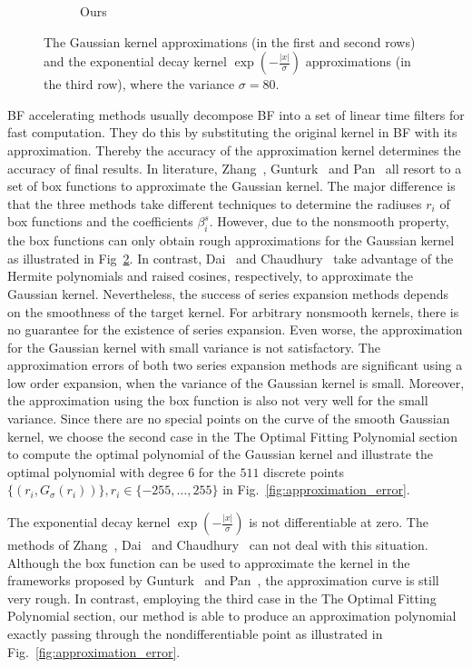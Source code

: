 \documentclass[twocolumn]{el-author}
\begin{document}
\begin{figure}[t]
\begin{subfigure}[b]{0.32\linewidth}
    \caption{Ours}
    \label{fig:minimax_path:path}
\end{subfigure}
\caption{The Gaussian kernel approximations (in the first and second rows) and the exponential decay kernel $\exp(-\frac{|x|}{\sigma})$  approximations (in the third row), where the variance $\sigma=80$.
}
\label{fig:gaussian}
\vspace{-0.1cm}
\end{figure}

BF accelerating methods usually decompose BF into a set of linear time filters for fast computation. They do this by substituting the original kernel in BF with its approximation. Thereby the accuracy of the approximation kernel determines the accuracy of final results. In literature, Zhang~\cite{Zhang_2012_TIP}, Gunturk~\cite{Gunturk_TIP_2011} and Pan~\cite{Pan_MPE_2014} all resort to a set of box functions to approximate the Gaussian kernel. The major difference is that the three methods take different techniques to determine the radiuses $r_i$ of box functions and the coefficients $\beta^s_i$. However, due to the nonsmooth property, the box functions can only obtain rough approximations for the Gaussian kernel as illustrated in Fig~\ref{fig:gaussian}. In contrast, Dai~\cite{Dai_ET_2014} and Chaudhury~\cite{Chaudhury_TIP_2011} take advantage of the Hermite polynomials and raised cosines, respectively, to approximate the Gaussian kernel. Nevertheless, the success of series expansion methods depends on the smoothness of the target kernel. For arbitrary nonsmooth kernels, there is no guarantee for the existence of series expansion. Even worse, the approximation for the Gaussian kernel with small variance is not satisfactory. The approximation errors of both two series expansion methods are significant using a low order expansion, when the variance of the Gaussian kernel is small. Moreover, the approximation using the box function is also not very well for the small variance. Since there are no special points on the curve of the smooth Gaussian kernel, we choose the second case in the The Optimal Fitting Polynomial section to compute the optimal polynomial of the Gaussian kernel and illustrate the optimal polynomial with degree $6$ for the $511$ discrete points $\{(r_i, G_{\sigma}(r_i))\}, r_i \in \{-255, \ldots, 255 \}$ in Fig.~\ref{fig:approximation_error}.


The exponential decay kernel $\exp(-\frac{|x|}{\sigma})$ is not differentiable at zero. The methods of Zhang~\cite{Zhang_2012_TIP}, Dai~\cite{Dai_ET_2014} and Chaudhury~\cite{Chaudhury_TIP_2011} can not deal with this situation. Although the box function can be used to approximate the kernel in the frameworks proposed by Gunturk~\cite{Gunturk_TIP_2011} and Pan~\cite{Pan_MPE_2014}, the approximation curve is still very rough. In contrast, employing the third case in the The Optimal Fitting Polynomial section, our method is able to produce an approximation polynomial exactly passing through the nondifferentiable point as illustrated in Fig.~\ref{fig:approximation_error}.
\end{document}
